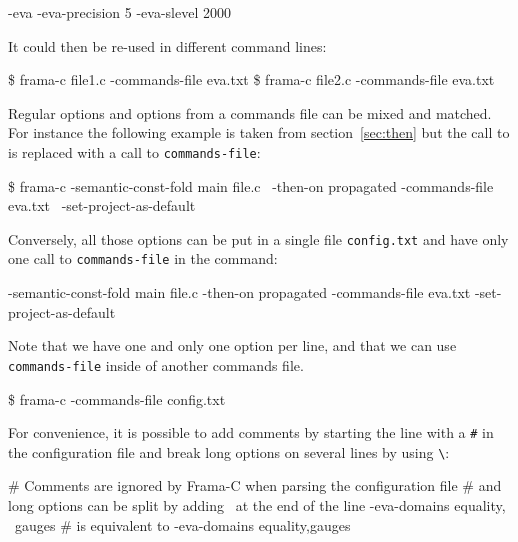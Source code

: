 \begin{frama-c-commands}
-eva
-eva-precision 5
-eva-slevel 2000
\end{frama-c-commands}

It could then be re-used in different command lines:

\begin{frama-c-commands}
\$ frama-c file1.c -commands-file eva.txt
\$ frama-c file2.c -commands-file eva.txt
\end{frama-c-commands}

Regular options and options from a commands file can be mixed and matched. For
instance the following example is taken from section~\ref{sec:then} but the call
to \Eva is replaced with a call to \texttt{\optiondef{-}commands-file}:

\begin{frama-c-commands}
\$ frama-c -semantic-const-fold main file.c \
          -then-on propagated -commands-file eva.txt \
          -set-project-as-default
\end{frama-c-commands}

Conversely, all those options can be put in a single file \texttt{config.txt}
and have only one call to \texttt{\optiondef{-}commands-file} in the \FramaC
command:

\begin{frama-c-commands}
-semantic-const-fold main
file.c
-then-on propagated
-commands-file eva.txt
-set-project-as-default
\end{frama-c-commands}

Note that we have one and only one option per line, and that we can use
\texttt{\optiondef{-}commands-file} inside of another commands file.

\begin{frama-c-commands}
\$ frama-c -commands-file config.txt
\end{frama-c-commands}

For convenience, it is possible to add comments by starting the line with a
\texttt{\#} in the configuration file and break long options on several lines
by using \texttt{\textbackslash}:

\begin{frama-c-commands}
# Comments are ignored by Frama-C when parsing the configuration file
# and long options can be split by adding \ at the end of the line
-eva-domains equality, \
             gauges
# is equivalent to
-eva-domains equality,gauges
\end{frama-c-commands}

